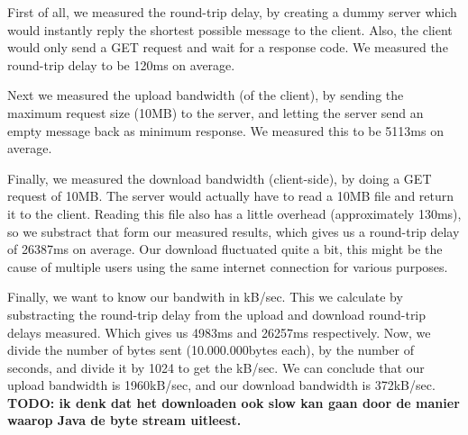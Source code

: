 First of all, we measured the round-trip delay, by creating a dummy server
which would instantly reply the shortest possible message to the client. Also,
the client would only send a GET request and wait for a response code. We
measured the round-trip delay to be 120ms on average.

Next we measured the upload bandwidth (of the client), by sending the maximum
request size (10MB) to the server, and letting the server send an empty message
back as minimum response. We measured this to be 5113ms on average. 

Finally, we measured the download bandwidth (client-side), by doing a GET
request of 10MB. The server would actually have to read a 10MB file and return
it to the client. Reading this file also has a little overhead (approximately
130ms), so we substract that form our measured results, which gives us a
round-trip delay of 26387ms on average. Our download fluctuated quite a bit,
this might be the cause of multiple users using the same internet connection
for various purposes.

Finally, we want to know our bandwith in kB/sec. This we calculate by
substracting the round-trip delay from the upload and download round-trip
delays measured. Which gives us 4983ms and 26257ms respectively. Now, we divide
the number of bytes sent (10.000.000bytes each), by the number of seconds, and
divide it by 1024 to get the kB/sec. We can conclude that our upload bandwidth
is 1960kB/sec, and our download bandwidth is 372kB/sec. \textbf{TODO: ik denk
dat het downloaden ook slow kan gaan door de manier waarop Java de byte stream
uitleest.}



